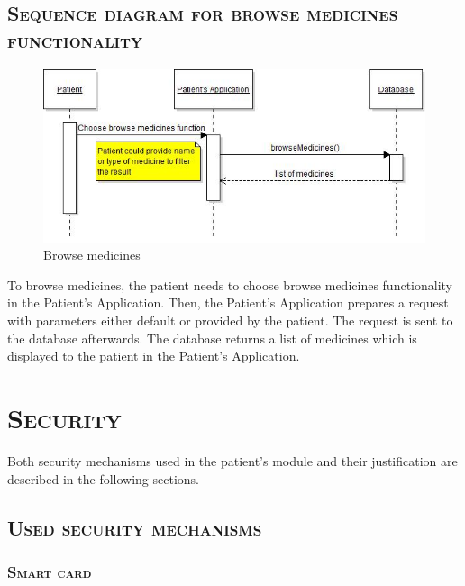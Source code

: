 \documentclass[12pt,titlepage]{article}
\begin{document}
\subsection{\textsc{Sequence diagram for browse medicines functionality}}
\begin{figure}[!h]
\includegraphics[width=\linewidth]{browseMedicinesSequenceDiagram}
\caption{Browse medicines}
\end{figure}
To browse medicines, the patient needs to choose browse medicines functionality in the Patient’s Application. 
Then, the Patient’s Application prepares a request with parameters either default or provided by the patient. 
The request is sent to the database afterwards. 
The database returns a list of medicines which is displayed to the patient in the Patient’s Application.
\newpage


\section{\textsc{Security}}

Both security mechanisms used in the patient's module and their justification are described in the following sections.

\subsection{\textsc{Used security mechanisms}}

\subsubsection{\textsc{Smart card}}
\end{document}
